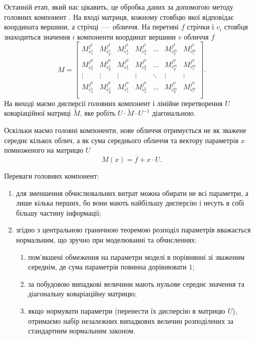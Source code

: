 Останній етап, який нас цікавить,
це обробка даних за допомогою методу головних компонент \cite{Aivazyan:1989}.
На вході матриця, кожному стовбцю якої відповідає координата вершини,
а стрічці~---~обличчя.
На перетині $f$ стрічки і $v_i$ стовбця знаходиться значення $i$ компоненти
координат вершини $v$ обличчя $f$
\begin{equation*}
  M = \begin{bmatrix}
    M_{v_x^1}^{f^1} & M_{v_y^1}^{f^1} & M_{v_z^1}^{f^1} & M_{v_x^2}^{f^1}
      & \dots                         & M_{v_y^m}^{f^1} & M_{v_z^m}^{f^1} \\
    M_{v_x^1}^{f^2} & M_{v_y^1}^{f^2} & M_{v_z^1}^{f^2} & M_{v_x^2}^{f^2}
      & \dots                         & M_{v_y^m}^{f^2} & M_{v_z^m}^{f^2} \\
    \vdots          & \vdots          & \vdots          & \vdots
      & \ddots                        & \vdots          & \vdots \\
    M_{v_x^1}^{f^n} & M_{v_y^1}^{f^n} & M_{v_z^1}^{f^n} & M_{v_x^2}^{f^n}
      & \dots                         & M_{v_y^m}^{f^n} & M_{v_z^m}^{f^n} \\
  \end{bmatrix}.
\end{equation*}
На виході маємо дисперсії головних компонент
і лінійне перетворення $U$ коваріаційної матриці $\widetilde{M}$,
яке робіть $U \cdot \widetilde{M} \cdot U^{-1}$ діагональною.

Оскільки маємо головні компоненти,
нове обличчя отримується не як зважене середнє кількох облич,
а як сума середнього обличчя та вектору параметрів $x$
помноженого на матрицю $U$
\begin{equation*}
  M\left( x \right) = \overline{f} + x \cdot U.
\end{equation*}

Переваги головних компонент:
\begin{enumerate}
  \item для зменшення обчислювальних витрат можна обирати не всі параметри,
    а лише кілька перших,
    бо вони мають найбільшу дисперсію
    і несуть в собі більшу частину інформації;
  \item згідно з центральною граничною теоремою
    розподіл параметрів вважається нормальним,
      що зручно при моделюванні та обчисленнях:
  \begin{enumerate}
    \item пом'якшені обмеження на параметри моделі в порівнянні
      зі зваженим середнім, де сума параметрів повинна дорівнювати $1$;
    \item за побудовою випадкові величини мають нульове середнє значення
      та діагональну коваріаційну матрицю;
    \item якщо нормувати параметри (перенести їх дисперсію в матрицю $U$),
      отримаємо набір незалежних випадкових величин
      розподілених за стандартним нормальним законом.
  \end{enumerate}
\end{enumerate}

